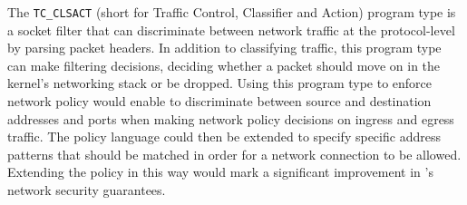 The \texttt{TC\_CLSACT} (short for Traffic Control, Classifier and Action) program type is
a socket filter that can discriminate between network traffic at the protocol-level by
parsing packet headers. In addition to classifying traffic, this program type can make
filtering decisions, deciding whether a packet should move on in the kernel's networking
stack or be dropped. Using this program type to enforce network policy would enable
\bpfcontain{} to discriminate between source and destination addresses and ports when
making network policy decisions on ingress and egress traffic. The policy language could
then be extended to specify specific address patterns that should be matched in order for
a network connection to be allowed. Extending the \bpfcontain{} policy in this way would
mark a significant improvement in \bpfcontain{}'s network security guarantees.



